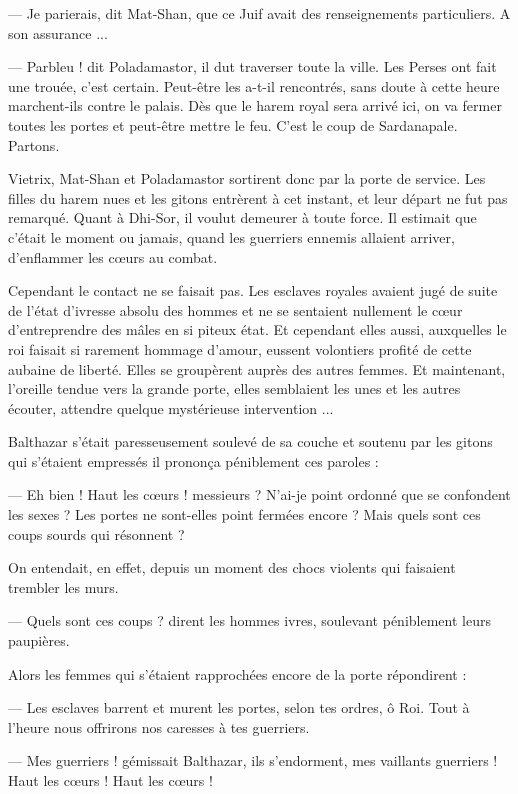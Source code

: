\documentclass[a4paper, 11pt, oneside, polutonikogreek, french]{article}
\begin{document}
--- Je parierais, dit Mat-Shan, que ce Juif avait des renseignements particuliers. A son assurance ...

--- Parbleu ! dit Poladamastor, il dut traverser toute la ville. Les Perses ont fait une trouée, c'est certain. Peut-être les a-t-il rencontrés, sans doute à cette heure marchent-ils contre le palais. Dès que le harem royal sera arrivé ici, on va fermer toutes les portes et peut-être mettre le feu. C'est le coup de Sardanapale. Partons.

Vietrix, Mat-Shan et Poladamastor sortirent donc par la porte de service. Les filles du harem nues et les gitons entrèrent à cet instant, et leur départ ne fut pas remarqué. Quant à Dhi-Sor, il voulut demeurer à toute force. Il estimait que c'était le moment ou jamais, quand les guerriers ennemis allaient arriver, d'enflammer les cœurs au combat.

\bigskip
\centerline{\EightStarTaper}
\centerline{\EightStarTaper\EightStarTaper}
\bigskip

Cependant le contact ne se faisait pas. Les esclaves royales avaient jugé de suite de l'état d'ivresse absolu des hommes et ne se sentaient nullement le cœur d'entreprendre des mâles en si piteux état. Et cependant elles aussi, auxquelles le roi faisait si rarement hommage d'amour, eussent volontiers profité de cette aubaine de liberté. Elles se groupèrent auprès des autres femmes. Et maintenant, l'oreille tendue vers la grande porte, elles semblaient les unes et les autres écouter, attendre quelque mystérieuse intervention ...

Balthazar s'était paresseusement soulevé de sa couche et soutenu par les gitons qui s'étaient empressés il prononça péniblement ces paroles :

--- Eh bien ! Haut les cœurs ! messieurs ? N'ai-je point ordonné que se confondent les sexes ? Les portes ne sont-elles point fermées encore ? Mais quels sont ces coups sourds qui résonnent ?

On entendait, en effet, depuis un moment des chocs violents qui faisaient trembler les murs.

--- Quels sont ces coups ? dirent les hommes ivres, soulevant péniblement leurs paupières.

Alors les femmes qui s'étaient rapprochées encore de la porte répondirent :

--- Les esclaves barrent et murent les portes, selon tes ordres, ô Roi. Tout à l'heure nous offrirons nos caresses à tes guerriers.

--- Mes guerriers ! gémissait Balthazar, ils s'endorment, mes vaillants guerriers ! Haut les cœurs ! Haut les cœurs !
\end{document}
